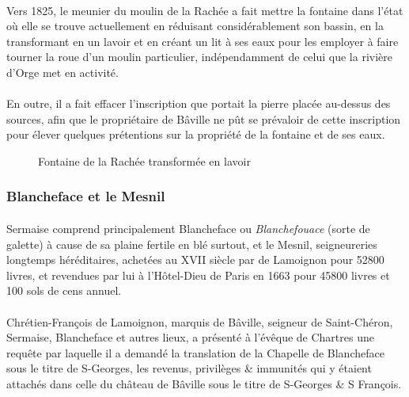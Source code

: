 \documentclass[../eBook.tex]{subfiles}
\begin{document}
      \paragraph{}Vers 1825, le meunier du moulin de la Rachée a fait mettre la fontaine dans l'état où elle se trouve actuellement en réduisant considérablement son bassin, en la transformant en un lavoir et en créant un lit à ses eaux pour les employer à faire tourner la roue d'un moulin particulier, indépendamment de celui que la rivière d'Orge met en activité.
      \paragraph{}En outre, il a fait effacer l'inscription que portait la pierre placée au-dessus des sources, afin que le propriétaire de Bâville ne pût se prévaloir de cette inscription pour élever quelques prétentions sur la propriété de la fontaine et de ses eaux.
      \newpage %
      \begin{center}
         \begin{figure}[!ht]
          \caption*{Fontaine de la Rachée transformée en lavoir}
        \end{figure}
       \end{center}

    \subsubsection*{Blancheface et le Mesnil}
      \paragraph{}Sermaise comprend principalement Blancheface ou \textit{Blanchefouace} (sorte de galette) à cause de sa plaine fertile en blé surtout, et le Mesnil, seigneureries longtemps héréditaires, achetées au XVII siècle par de Lamoignon pour 52800 livres, et revendues par lui à l'Hôtel-Dieu de Paris en 1663 pour 45800 livres et 100 sols de cens annuel.
      \paragraph{}Chrétien-François de Lamoignon, marquis de Bâville, seigneur de Saint-Chéron, Sermaise, Blancheface et autres lieux, a présenté à l'évêque de Chartres une requête par laquelle il a demandé la translation de la Chapelle de Blancheface sous le titre de S-Georges, les revenus, privilèges \& immunités qui y étaient attachés dans celle du château de Bâville sous le titre de S-Georges \& S François.
\end{document}

